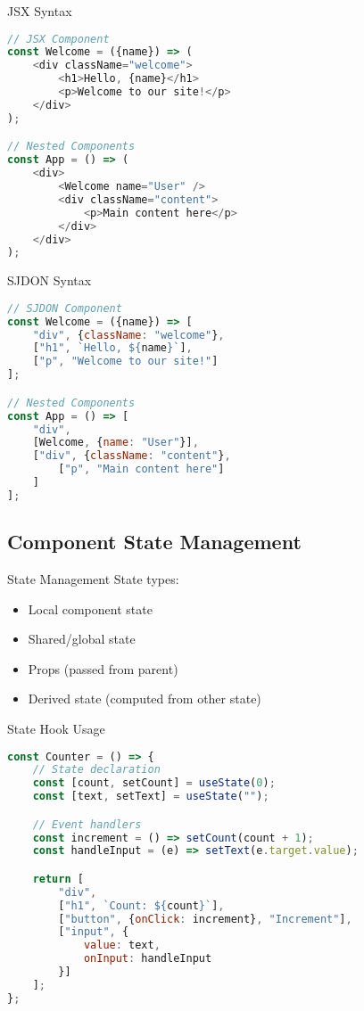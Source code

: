 \begin{KR}{JSX Syntax}
\begin{lstlisting}[language=JavaScript, style=basesmol]
// JSX Component
const Welcome = ({name}) => (
    <div className="welcome">
        <h1>Hello, {name}</h1>
        <p>Welcome to our site!</p>
    </div>
);

// Nested Components
const App = () => (
    <div>
        <Welcome name="User" />
        <div className="content">
            <p>Main content here</p>
        </div>
    </div>
);
\end{lstlisting}
\end{KR}

\begin{KR}{SJDON Syntax}
\begin{lstlisting}[language=JavaScript, style=basesmol]
// SJDON Component
const Welcome = ({name}) => [
    "div", {className: "welcome"},
    ["h1", `Hello, ${name}`],
    ["p", "Welcome to our site!"]
];

// Nested Components
const App = () => [
    "div",
    [Welcome, {name: "User"}],
    ["div", {className: "content"},
        ["p", "Main content here"]
    ]
];
\end{lstlisting}
\end{KR}

\subsection{Component State Management}

\begin{concept}{State Management}
    State types:
    \begin{itemize}
        \item Local component state
        \item Shared/global state
        \item Props (passed from parent)
        \item Derived state (computed from other state)
    \end{itemize}
\end{concept}

\begin{KR}{State Hook Usage}
\begin{lstlisting}[language=JavaScript, style=basesmol]
const Counter = () => {
    // State declaration
    const [count, setCount] = useState(0);
    const [text, setText] = useState("");

    // Event handlers
    const increment = () => setCount(count + 1);
    const handleInput = (e) => setText(e.target.value);

    return [
        "div",
        ["h1", `Count: ${count}`],
        ["button", {onClick: increment}, "Increment"],
        ["input", {
            value: text,
            onInput: handleInput
        }]
    ];
};
\end{lstlisting}
\end{KR}

